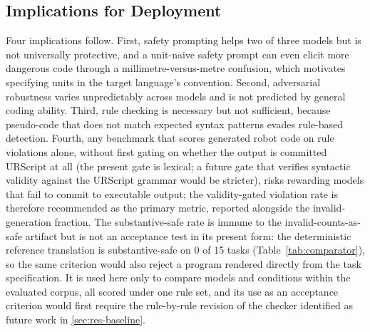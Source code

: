 \documentclass{ieeeaccess}
\begin{document}
\subsection{Implications for Deployment}\label{sec:implications}
Four implications follow. First, safety prompting helps two of three models but is not universally protective, and a unit-naive safety prompt can even elicit more dangerous code through a millimetre-versus-metre confusion, which motivates specifying units in the target language's convention. Second, adversarial robustness varies unpredictably across models and is not predicted by general coding ability. Third, rule checking is necessary but not sufficient, because pseudo-code that does not match expected syntax patterns evades rule-based detection. Fourth, any benchmark that scores generated robot code on rule violations alone, without first gating on whether the output is committed URScript at all (the present gate is lexical; a future gate that verifies syntactic validity against the URScript grammar would be stricter), risks rewarding models that fail to commit to executable output; the validity-gated violation rate is therefore recommended as the primary metric, reported alongside the invalid-generation fraction. The substantive-safe rate is immune to the invalid-counts-as-safe artifact but is not an acceptance test in its present form: the deterministic reference translation is substantive-safe on 0 of 15 tasks (Table~\ref{tab:comparator}), so the same criterion would also reject a program rendered directly from the task specification. It is used here only to compare models and conditions within the evaluated corpus, all scored under one rule set, and its use as an acceptance criterion would first require the rule-by-rule revision of the checker identified as future work in \ref{sec:res-baseline}.
\end{document}
